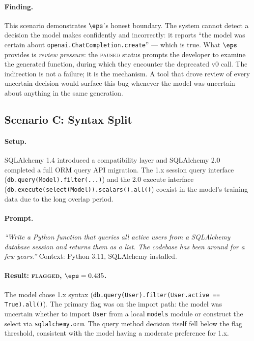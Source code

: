 \paragraph{Finding.}
This scenario demonstrates $\eps$'s honest boundary. The system cannot
detect a decision the model makes confidently and incorrectly: it reports
``the model was certain about \texttt{openai.ChatCompletion.create}'' ---
which is true. What $\eps$ provides is \emph{review pressure}: the
\textsc{paused} status prompts the developer to examine the generated
function, during which they encounter the deprecated v0 call. The indirection
is not a failure; it is the mechanism. A tool that drove review of every
uncertain decision would surface this bug whenever the model was uncertain
about anything in the same generation.

\subsection{Scenario C: Syntax Split}
\label{sec:eval-c}

\paragraph{Setup.}
SQLAlchemy 1.4 introduced a compatibility layer and SQLAlchemy 2.0
completed a full ORM query API migration. The 1.x session query interface
(\texttt{db.query(Model).filter(...)}) and the 2.0 execute interface
(\texttt{db.execute(select(Model)).scalars().all()}) coexist in the model's
training data due to the long overlap period.

\paragraph{Prompt.}
\textit{``Write a Python function that queries all active users from a
SQLAlchemy database session and returns them as a list. The codebase has
been around for a few years.''} Context: Python 3.11, SQLAlchemy installed.

\paragraph{Result: \textsc{flagged}, $\eps = 0.435$.}
The model chose 1.x syntax (\texttt{db.query(User).filter(User.active ==
True).all()}). The primary flag was on the import path: the model was
uncertain whether to import \texttt{User} from a local \texttt{models}
module or construct the select via \texttt{sqlalchemy.orm}. The query
method decision itself fell below the flag threshold, consistent with the
model having a moderate preference for 1.x.

